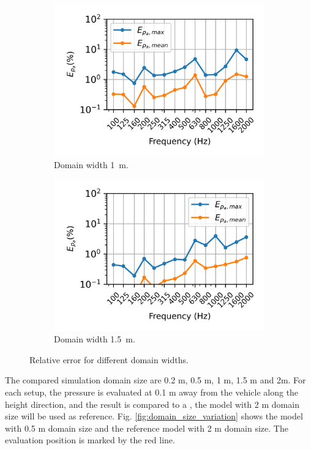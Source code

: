 \begin{figure}
	\begin{subfigure}[b]{0.48\textwidth}
		\centering
		\includegraphics{fig/chap4/simulation_domain/width_1m.png}
		\caption{Domain width \SI{1}{\meter}.}
	\end{subfigure}
	\hfill
	\begin{subfigure}[b]{0.48\textwidth}
		\centering
		\includegraphics{fig/chap4/simulation_domain/width_1pt5m.png}
		\caption{Domain width \SI{1.5}{\meter}.}
	\end{subfigure}
	\caption{Relative error for different domain widths.}
\end{figure}

The compared simulation domain size are 0.2 m, 0.5 m, 1 m, 1.5 m and 2m. For each setup, the pressure is evaluated at 0.1 m away from the vehicle along the height direction, and the result is compared to a , the model with 2 m domain size will be used as reference. Fig. \ref{fig:domain_size_variation} shows the model with 0.5 m domain size and the reference model with 2 m domain size. The evaluation position is marked by the red line.

